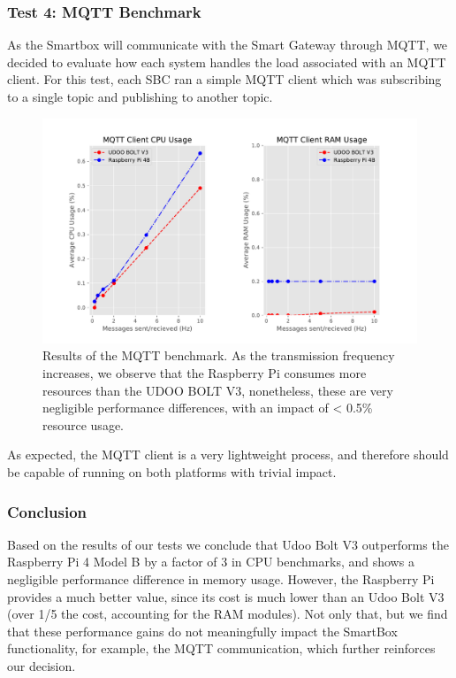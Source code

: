 \subsubsection{Test 4: \acs{MQTT} Benchmark}
As the Smartbox will communicate with the Smart Gateway through \acs{MQTT}, we decided to evaluate how each system handles the load associated with an MQTT client. For this test, each \acs{SBC} ran a simple \acs{MQTT} client which was subscribing to a single topic and publishing to another topic.

\begin{figure}[H]
    \centering
    \includegraphics[width=\linewidth]{images/mqtt_test_results.pdf}
    \caption[Results of the MQTT benchmark.]{Results of the MQTT benchmark. As the transmission frequency increases, we observe that the Raspberry Pi consumes more resources than the UDOO BOLT V3, nonetheless, these are very negligible performance differences, with an impact of < 0.5\% resource usage.}
    \label{fig:mqtt-tests}
\end{figure}

As expected, the \acs{MQTT} client is a very lightweight process, and therefore should be capable of running on both platforms with trivial impact.

\subsubsection{Conclusion}

Based on the results of our tests we conclude that Udoo Bolt V3 outperforms the Raspberry Pi 4 Model B by a factor of 3 in CPU benchmarks, and shows a negligible performance difference in memory usage. However, the Raspberry Pi provides a much better value, since its cost is much lower than an Udoo Bolt V3 (over 1/5 the cost, accounting for the RAM modules). Not only that, but we find that these performance gains do not meaningfully impact the SmartBox functionality, for example, the MQTT communication, which further 
reinforces our decision.

